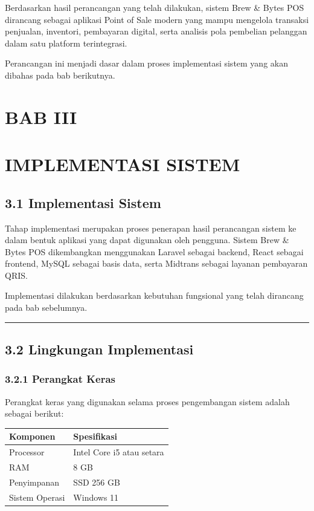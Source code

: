 Berdasarkan hasil perancangan yang telah dilakukan, sistem Brew \& Bytes POS dirancang sebagai aplikasi Point of Sale modern yang mampu mengelola transaksi penjualan, inventori, pembayaran digital, serta analisis pola pembelian pelanggan dalam satu platform terintegrasi.

Perancangan ini menjadi dasar dalam proses implementasi sistem yang akan dibahas pada bab berikutnya.

\section{BAB III}\label{bab-iii}

\section{IMPLEMENTASI SISTEM}\label{implementasi-sistem}

\subsection{3.1 Implementasi Sistem}\label{implementasi-sistem-1}

Tahap implementasi merupakan proses penerapan hasil perancangan sistem ke dalam bentuk aplikasi yang dapat digunakan oleh pengguna. Sistem Brew \& Bytes POS dikembangkan menggunakan Laravel sebagai backend, React sebagai frontend, MySQL sebagai basis data, serta Midtrans sebagai layanan pembayaran QRIS.

Implementasi dilakukan berdasarkan kebutuhan fungsional yang telah dirancang pada bab sebelumnya.

\begin{center}\rule{0.5\linewidth}{0.5pt}\end{center}

\subsection{3.2 Lingkungan Implementasi}\label{lingkungan-implementasi}

\subsubsection{3.2.1 Perangkat Keras}\label{perangkat-keras}

Perangkat keras yang digunakan selama proses pengembangan sistem adalah sebagai berikut:

{\def\LTcaptype{none} %
\begin{longtable}[]{@{}ll@{}}
\toprule\noalign{}
Komponen & Spesifikasi \\
\midrule\noalign{}
\endhead
\bottomrule\noalign{}
\endlastfoot
Processor & Intel Core i5 atau setara \\
RAM & 8 GB \\
Penyimpanan & SSD 256 GB \\
Sistem Operasi & Windows 11 \\
\end{longtable}
}

